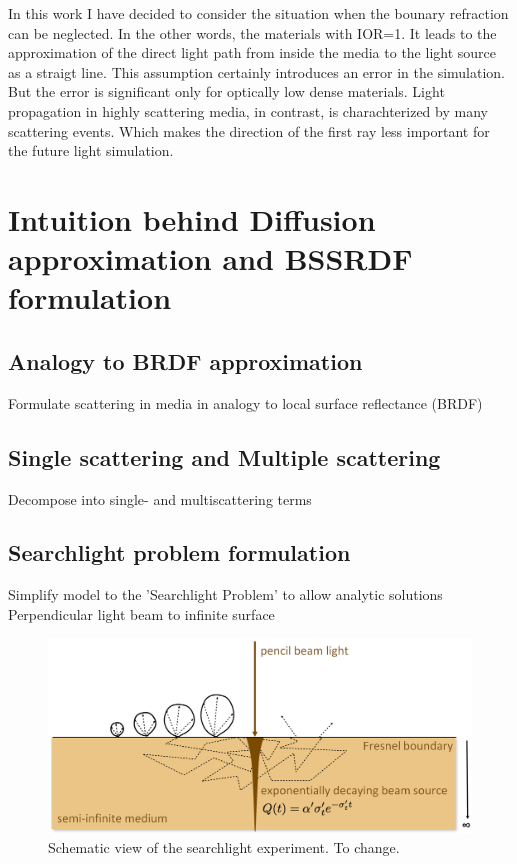 In this work I have decided to consider the situation when the bounary
refraction can be neglected. In the other words, the materials with \gls{IOR}=1.
It leads to the approximation of the direct light path from inside the media to the light source as a straigt line. This assumption certainly
introduces an error in the simulation. But the error is significant only for
optically low dense materials. Light propagation in highly scattering media, in
contrast, is charachterized by many scattering events. Which makes the direction
of the first ray less important for the future light simulation.

\section{Intuition behind Diffusion approximation and BSSRDF formulation}

\subsection{Analogy to BRDF approximation}
Formulate scattering in media in analogy to local surface reflectance (BRDF)

\subsection{Single scattering and Multiple scattering}
Decompose into single- and multiscattering terms

\subsection{Searchlight problem formulation}
Simplify model to the 'Searchlight Problem' to allow analytic solutions
Perpendicular light beam to infinite surface \cite{Jacques1995}
\begin{figure}[h]
    \centering
    \includegraphics[width=\textwidth]{imgs/schemes/searchlight_disney}
    \caption{Schematic view of the searchlight experiment. To change.}
    \label{fig:searchlight_scheme}
\end{figure}

